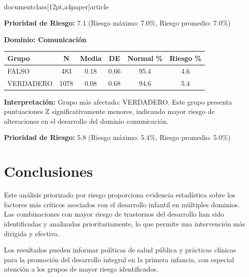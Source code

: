 \\documentclass[12pt,a4paper]{article}
\begin{document}
\textbf{Prioridad de Riesgo:} 7.1 (Riesgo máximo: 7.0\%, Riesgo promedio: 7.0\%)


\vspace{0.5cm}


\textbf{Dominio: Comunicación}


\begin{center}
\begin{tabular}{|l|c|c|c|c|c|}
\hline
\textbf{Grupo} & \textbf{N} & \textbf{Media} & \textbf{DE} & \textbf{Normal \%} & \textbf{Riesgo \%} \\
\hline
FALSO & 483 & 0.18 & 0.66 & 95.4 & 4.6 \\
VERDADERO & 1078 & 0.08 & 0.68 & 94.6 & 5.4 \\

\hline
\end{tabular}
\end{center}


\textbf{Interpretación:} Grupo más afectado: VERDADERO. Este grupo presenta puntuaciones Z significativamente menores, indicando mayor riesgo de alteraciones en el desarrollo del dominio comunicación.

\textbf{Prioridad de Riesgo:} 5.8 (Riesgo máximo: 5.4\%, Riesgo promedio: 5.0\%)


\vspace{0.5cm}


\section{Conclusiones}

Este análisis priorizado por riesgo proporciona evidencia estadística sobre los factores más críticos asociados con el desarrollo infantil en múltiples dominios. Las combinaciones con mayor riesgo de trastornos del desarrollo han sido identificadas y analizadas prioritariamente, lo que permite una intervención más dirigida y efectiva.

Los resultados pueden informar políticas de salud pública y prácticas clínicas para la promoción del desarrollo integral en la primera infancia, con especial atención a los grupos de mayor riesgo identificados.
\end{document}

